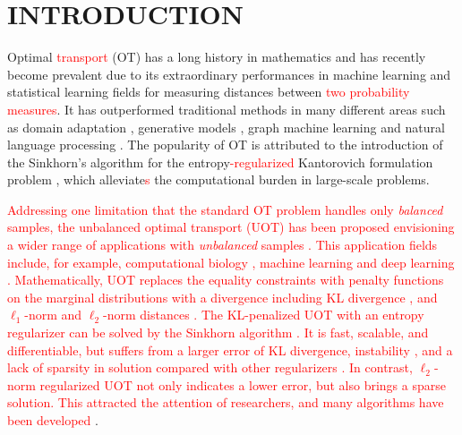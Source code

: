 \documentclass[twoside]{article}
\theoremstyle{plain}
\newcommand{\changeHK}[1]{\textcolor{red}{#1}}
\begin{document}
\section{INTRODUCTION}
\label{sec:int}
Optimal \changeHK{transport} (OT) has a long history in mathematics and has recently become prevalent due to its extraordinary performances in machine learning and statistical learning fields for measuring distances between \changeHK{two probability measures}. It has outperformed traditional methods in many different areas such as domain adaptation \citep{7586038}, generative models \citep{arjovsky2017wasserstein}, graph machine learning \citep{Maretic_NIPS_2019} and natural language processing \citep{084adf2f555549c493e0331a00e4ecad}. The popularity of OT is attributed to the introduction of the Sinkhorn's algorithm \citep{10.2307/2040061} for the entropy\changeHK{-regularized} Kantorovich formulation problem \citep{NIPS2013_af21d0c9}, which alleviate\changeHK{s} the computational burden in large-scale problems. 

\changeHK{Addressing one limitation that the standard OT problem handles only {\it balanced} samples, the unbalanced optimal transport (UOT) has been proposed envisioning a wider range of applications with {\it unbalanced} samples \citep{Caffarelli_AM_2010,chizat2017scaling}. This application fields include, for example, computational biology \citep{SCHIEBINGER2019928}, machine learning \citep{Janati_AISTATS_2019} and deep learning \citep{Yang_ICLR_2019}. Mathematically, UOT replaces the equality constraints with penalty functions on the marginal distributions with a divergence including KL divergence \citep{Liero:2018wo}, and $\ell_1$-norm \citep{Caffarelli_AM_2010} and $\ell_2$-norm distances \citep{refId0}. The KL-penalized UOT with an entropy regularizer can be solved by the Sinkhorn algorithm \citep{UOTSinkhorn2020}. It is fast, scalable, and differentiable, but suffers from a larger error of KL divergence, instability \citep{DBLP:journals/corr/Schmitzer16}, and a lack of sparsity in solution compared with other regularizers \citep{Blondel_AISTATS_2018}. In contrast, $\ell_2$-norm regularized UOT not only indicates a lower error, but also brings a sparse solution. This attracted the attention of researchers, and many algorithms have been developed \citep{Blondel_AISTATS_2018, Nguyen_arXiv_2022}}.
\end{document}
